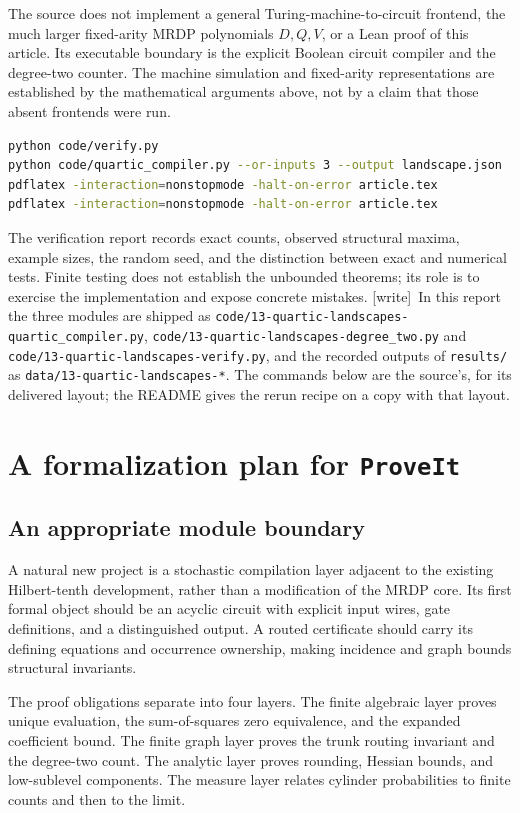 \documentclass[11pt,letterpaper]{article}
\numberwithin{equation}{section}
\theoremstyle{definition}
\theoremstyle{remark}
\newcommand{\code}[1]{\nolinkurl{#1}}
\newcommand{\wtag}{\textup{[write]}}
\newcommand{\srcmark}[1]{\par\noindent{\small\itshape [source~#1]}\par}
\newcommand{\reponame}{\texttt{ProveIt}}
\begin{document}
The source does not implement a general Turing-machine-to-circuit frontend,
the much larger fixed-arity MRDP polynomials $D,Q,V$, or a Lean proof of
this article. Its executable boundary is the explicit Boolean circuit
compiler and the degree-two counter. The machine simulation and
fixed-arity representations are established by the mathematical arguments
above, not by a claim that those absent frontends were run.

\begin{lstlisting}[language=bash]
python code/verify.py
python code/quartic_compiler.py --or-inputs 3 --output landscape.json
pdflatex -interaction=nonstopmode -halt-on-error article.tex
pdflatex -interaction=nonstopmode -halt-on-error article.tex
\end{lstlisting}
The verification report records exact counts, observed structural maxima,
example sizes, the random seed, and the distinction between exact and
numerical tests. Finite testing does not establish the unbounded theorems;
its role is to exercise the implementation and expose concrete mistakes.
\wtag\ In this report the three modules are shipped as
\code{code/13-quartic-landscapes-quartic_compiler.py},
\code{code/13-quartic-landscapes-degree_two.py} and
\code{code/13-quartic-landscapes-verify.py}, and the recorded outputs of
\code{results/} as \code{data/13-quartic-landscapes-*}. The commands below are
the source's, for its delivered layout; the README gives the rerun recipe on a
copy with that layout.

\section{A formalization plan for \reponame}\label{pqc:ql:sec:formalization}
\srcmark{13}

\subsection{An appropriate module boundary}
A natural new project is a stochastic compilation layer adjacent to the
existing Hilbert-tenth development, rather than a modification of the
MRDP core. Its first formal object should be an acyclic circuit with
explicit input wires, gate definitions, and a distinguished output. A
routed certificate should carry its defining equations and occurrence
ownership, making incidence and graph bounds structural invariants.

The proof obligations separate into four layers. The finite algebraic
layer proves unique evaluation, the sum-of-squares zero equivalence, and
the expanded coefficient bound. The finite graph layer proves the trunk
routing invariant and the degree-two count. The analytic layer proves
rounding, Hessian bounds, and low-sublevel components. The measure layer
relates cylinder probabilities to finite counts and then to the limit.
\end{document}
